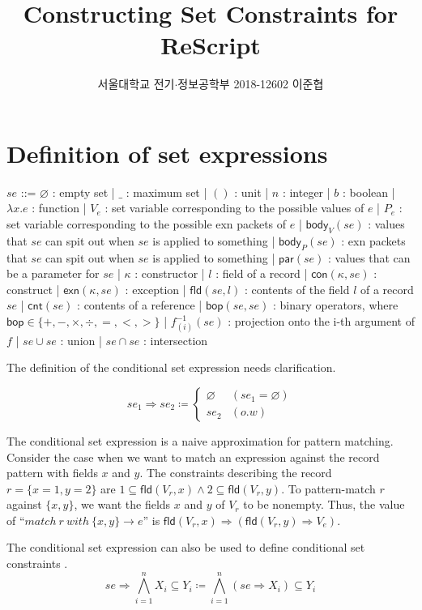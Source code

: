 \documentclass{article}
\title{Constructing Set Constraints for ReScript}
\author{서울대학교 전기$\cdot$정보공학부 2018-12602 이준협}
\date{}
\begin{document}
\maketitle
\section{Definition of set expressions}
\begin{bnfgrammar}
  $se$ ::= $\varnothing$ : empty set
  | $\_$ : maximum set
  | $()$ : unit
  | $n$ : integer
  | $b$ : boolean
  | $\lambda x.e$ : function
  | $V_{e}$ : set variable corresponding to the possible values of $e$
  | $P_{e}$ : set variable corresponding to the possible exn packets of $e$
  | $\mathsf{body}_{V}(se)$ : values that $se$ can spit out when $se$ is applied to something
  | $\mathsf{body}_{P}(se)$ : exn packets that $se$ can spit out when $se$ is applied to something
  | $\mathsf{par}(se)$ : values that can be a parameter for $se$
  | $\kappa$ : constructor
  | $l$ : field of a record
  | $\mathsf{con}(\kappa,se)$ : construct
  | $\mathsf{exn}(\kappa,se)$ : exception
  | $\mathsf{fld}(se, l)$ : contents of the field $l$ of a record $se$
  | $\mathsf{cnt}(se)$ : contents of a reference
  | $\mathsf{bop}(se, se)$ : binary operators, where $\mathsf{bop}\in\{+, -, \times, \div, =, <, >\}$
  | $f^{-1}_{(i)}(se)$ : projection onto the i-th argument of $f$
  | $se \cup se$ : union
  | $se \cap se$ : intersection
\end{bnfgrammar}

The definition of the conditional set expression needs clarification.

\[
  se_{1} \Rightarrow se_{2} \coloneq
  \begin{cases}
    \varnothing & (se_{1}=\varnothing)\\
    se_{2} & (o.w)
  \end{cases}
\]

The conditional set expression is a naive approximation for pattern matching. Consider the case when we want to match an expression against the record pattern with fields $x$ and $y$.
The constraints describing the record $r = \{x = 1, y = 2\}$ are $1 \subseteq \mathsf{fld}(V_{r}, x) \wedge 2 \subseteq \mathsf{fld}(V_{r}, y)$.
To pattern-match $r$ against $\{x, y\}$, we want the fields $x$ and $y$ of $V_{r}$ to be nonempty.
Thus, the value of ``$match\:r\:with\:\{x, y\}\rightarrow e$'' is $\mathsf{fld}(V_{r}, x)\Rightarrow(\mathsf{fld}(V_{r},y)\Rightarrow V_{e})$.

The conditional set expression can also be used to define conditional set constraints \cite{Aik99}.
\[
  se \Rightarrow \bigwedge_{i=1}^{n}{X_{i}\subseteq Y_{i}} \coloneq \bigwedge_{i=1}^{n}{(se \Rightarrow X_{i}) \subseteq Y_{i}}
\]
\end{document}
